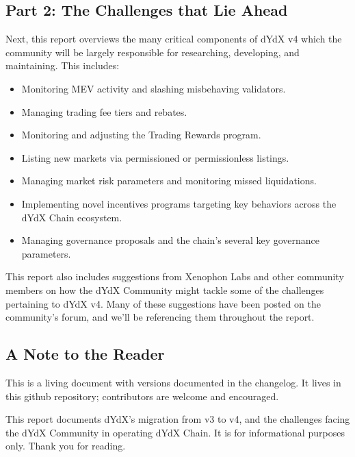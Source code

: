 \begin{fullwidth}
\begin{adjustwidth}{1cm}{1cm}
        \subsection*{Part 2: The Challenges that Lie Ahead} 
        
        Next, this report overviews the many critical components of dYdX v4 which the community will be largely responsible for researching, developing, and maintaining. This includes: %
    
        \begin{itemize}
            \item Monitoring MEV activity and slashing misbehaving validators.
            \item Managing trading fee tiers and rebates.
            \item Monitoring and adjusting the Trading Rewards program.
            \item Listing new markets via permissioned or permissionless listings.
            \item Managing market risk parameters and monitoring missed liquidations.
            \item Implementing novel incentives programs targeting key behaviors across the dYdX Chain ecosystem.
            \item Managing governance proposals and the chain's several key governance parameters.
        \end{itemize}
    
        This report also includes suggestions from Xenophon Labs and other community members on how the dYdX Community might tackle some of the challenges pertaining to dYdX v4. Many of these suggestions have been posted on the community's forum, and we'll be referencing them throughout the report. 
    
        \subsection*{A Note to the Reader} 
        
        This is a living document with versions documented in the changelog. It lives in this github repository; contributors are welcome and encouraged.
    
        \begin{center}
            \large
            This report documents dYdX's migration from v3 to v4, and the challenges facing the dYdX Community in operating dYdX Chain. It is for informational purposes only. Thank you for reading.
        \end{center}
    
    \end{adjustwidth}

\end{fullwidth}